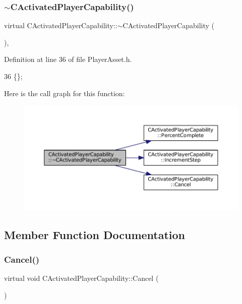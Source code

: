 \subsubsection{\texorpdfstring{$\sim$\+C\+Activated\+Player\+Capability()}{~CActivatedPlayerCapability()}}
{\footnotesize\ttfamily virtual C\+Activated\+Player\+Capability\+::$\sim$\+C\+Activated\+Player\+Capability (\begin{DoxyParamCaption}{ }\end{DoxyParamCaption})\hspace{0.3cm}{\ttfamily [inline]}, {\ttfamily [virtual]}}



Definition at line 36 of file Player\+Asset.\+h.


\begin{DoxyCode}
36 \{\};
\end{DoxyCode}
Here is the call graph for this function\+:
\nopagebreak
\begin{figure}[H]
\begin{center}
\leavevmode
\includegraphics[width=350pt]{classCActivatedPlayerCapability_a75845fda9554fb75644aae5a6c5f0084_cgraph}
\end{center}
\end{figure}


\subsection{Member Function Documentation}
\hypertarget{classCActivatedPlayerCapability_a5cde83be468e262ad054d81e28684a81}{}\label{classCActivatedPlayerCapability_a5cde83be468e262ad054d81e28684a81} 
\subsubsection{\texorpdfstring{Cancel()}{Cancel()}}
{\footnotesize\ttfamily virtual void C\+Activated\+Player\+Capability\+::\+Cancel (\begin{DoxyParamCaption}{ }\end{DoxyParamCaption})\hspace{0.3cm}{\ttfamily [pure virtual]}}



